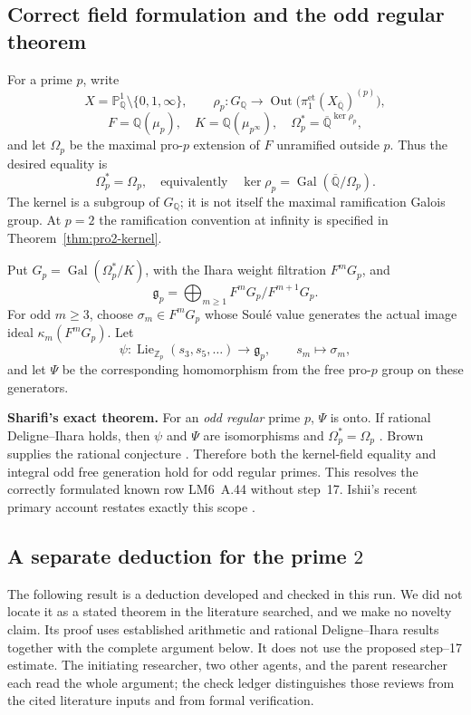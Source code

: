 \documentclass[11pt,a4paper]{article}
\theoremstyle{definition}
\begin{document}
\subsection{Correct field formulation and the odd regular theorem}

For a prime $p$, write
\[
 X=\mathbb P^1_{\mathbb Q}\setminus\{0,1,\infty\},\qquad
 \rho_p:G_{\mathbb Q}\longrightarrow
 \operatorname{Out}\bigl(\pi_1^{\mathrm{et}}(X_{\overline{\mathbb Q}})^{(p)}\bigr),
\]
\[
 F=\mathbb Q(\mu_p),\quad K=\mathbb Q(\mu_{p^\infty}),\quad
 \Omega_p^*=\overline{\mathbb Q}^{\ker\rho_p},
\]
and let $\Omega_p$ be the maximal pro-$p$ extension of $F$ unramified outside $p$. Thus the desired equality is
\[
 \Omega_p^*=\Omega_p,
 \quad\text{equivalently}\quad
 \ker\rho_p=\operatorname{Gal}(\overline{\mathbb Q}/\Omega_p).
\]
The kernel is a subgroup of $G_{\mathbb Q}$; it is not itself the maximal ramification Galois group. At $p=2$ the ramification convention at infinity is specified in Theorem~\ref{thm:pro2-kernel}.

Put $G_p=\operatorname{Gal}(\Omega_p^*/K)$, with the Ihara weight filtration $F^mG_p$, and
\[
 \mathfrak g_p=\bigoplus_{m\geq1}F^mG_p/F^{m+1}G_p.
\]
For odd $m\geq3$, choose $\sigma_m\in F^mG_p$ whose Soul\'e value generates the actual image ideal $\kappa_m(F^mG_p)$. Let
\[
 \psi:\operatorname{Lie}_{\mathbb Z_p}(s_3,s_5,\ldots)
       \longrightarrow\mathfrak g_p,
 \qquad s_m\longmapsto\sigma_m,
\]
and let $\Psi$ be the corresponding homomorphism from the free pro-$p$ group on these generators.

\textbf{Sharifi's exact theorem.} For an \emph{odd regular} prime $p$, $\Psi$ is onto. If rational Deligne--Ihara holds, then $\psi$ and $\Psi$ are isomorphisms and $\Omega_p^*=\Omega_p$ \cite[Theorem~1.1, author's preprint p.~2]{Sharifi2002}. Brown supplies the rational conjecture \cite{Brown2012,Brown2019}. Therefore both the kernel-field equality and integral odd free generation hold for odd regular primes. This resolves the correctly formulated known row LM6~A.44 without step~17. Ishii's recent primary account restates exactly this scope \cite[Theorem~1.1 and Remark~1.1.1, p.~2]{IshiiKernel2026}.

\subsection{A separate deduction for the prime \texorpdfstring{$2$}{2}}
\label{sec:pro2-proof}

The following result is a deduction developed and checked in this run. We did not locate it as a stated theorem in the literature searched, and we make no novelty claim. Its proof uses established arithmetic and rational Deligne--Ihara results together with the complete argument below. It does not use the proposed step--17 estimate. The initiating researcher, two other agents, and the parent researcher each read the whole argument; the check ledger distinguishes those reviews from the cited literature inputs and from formal verification.
\end{document}
